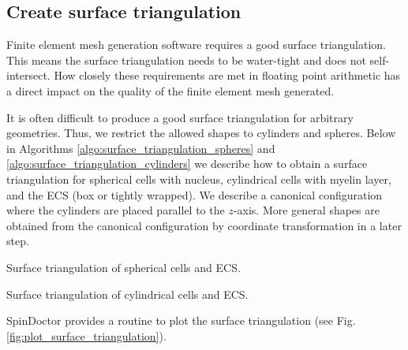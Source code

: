 \documentclass[a4paper]{article}
\begin{document}
\subsection{Create surface triangulation}

Finite element mesh generation software requires a good surface triangulation. This means the surface triangulation needs to be water-tight and does not self-intersect. How closely these requirements are met in floating point arithmetic has a direct impact on the quality of the finite element mesh generated.

It is often difficult to produce a good surface triangulation for arbitrary geometries. Thus, we restrict the allowed shapes to cylinders and spheres. Below in Algorithms \ref{algo:surface_triangulation_spheres} and \ref{algo:surface_triangulation_cylinders} we describe how to obtain a surface triangulation for spherical cells with nucleus, cylindrical cells with myelin layer, and the ECS (box or tightly wrapped). We describe a canonical configuration where the cylinders are placed parallel to the $z$-axis. More general shapes are obtained from the canonical configuration by coordinate transformation in a later step.

\begin{algorithm}
    
    \caption{Surface triangulation of spherical cells and ECS.}
    \label{algo:surface_triangulation_spheres}
\end{algorithm}

\begin{algorithm}
    
    \caption{Surface triangulation of cylindrical cells and ECS.}
    \label{algo:surface_triangulation_cylinders}
\end{algorithm}

SpinDoctor provides a routine to plot the surface triangulation (see Fig. \ref{fig:plot_surface_triangulation}).
\end{document}
